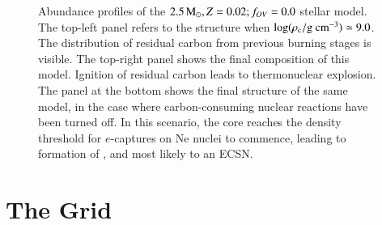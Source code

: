 \documentclass[main.tex]{subfiles}
\begin{document}
\begin{subappendices}
\begin{figure}[hbt!]
    \caption{Abundance profiles of the \seriesone $ 2.5\mathrm{\,M_\odot},  Z=0.02;f_{OV}=0.0$ stellar model. The top-left panel refers to the structure when $\rm \log(\rho_c / g \ cm^{-3}) \simeq 9.0$. The distribution of residual carbon from previous burning stages is visible. The top-right panel shows the final composition of this model. Ignition of residual carbon leads to thermonuclear explosion.
    The panel at the bottom shows the final structure of the same model, in the case where carbon-consuming nuclear reactions have been turned off.
    In this scenario, the core reaches the density threshold for $e$-captures on Ne nuclei to commence, leading to formation of , and most likely to an ECSN.}
    \label{apx:fig:eta1p0}
\end{figure}


\clearpage
\section{The \seriestwo Grid}\label{apx:composition_seriesII}


\end{subappendices}
\end{document}
